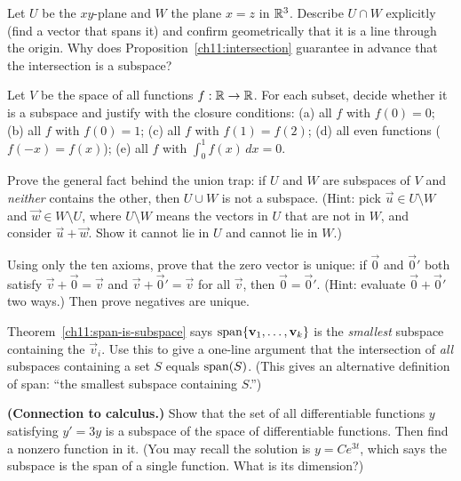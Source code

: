 \begin{exercise}\label{ch11:ex-intersection}
Let $U$ be the $xy$-plane and $W$ the plane $x = z$ in $\mathbb{R}^3$. Describe $U \cap W$
explicitly (find a vector that spans it) and confirm geometrically that it is a line
through the origin. Why does Proposition~\ref{ch11:intersection} guarantee in advance that
the intersection is a subspace?
\end{exercise}

\begin{exercise}\label{ch11:ex-functions}
Let $V$ be the space of all functions $f:\mathbb{R}\to\mathbb{R}$. For each subset, decide whether it is a
subspace and justify with the closure conditions:
(a) all $f$ with $f(0) = 0$; \quad (b) all $f$ with $f(0) = 1$;
(c) all $f$ with $f(1) = f(2)$; \quad (d) all even functions ($f(-x)=f(x)$);
(e) all $f$ with $\int_0^1 f(x)\,dx = 0$.
\end{exercise}

\begin{exercise}\label{ch11:ex-union-proof}
Prove the general fact behind the union trap: if $U$ and $W$ are subspaces of $V$ and
\emph{neither} contains the other, then $U \cup W$ is not a subspace.
(Hint: pick $\vec{u}\in U\setminus W$ and $\vec{w}\in W\setminus U$, where $U\setminus W$
means the vectors in $U$ that are not in $W$, and consider
$\vec{u}+\vec{w}$. Show it cannot lie in $U$ and cannot lie in $W$.)
\end{exercise}

\begin{exercise}\label{ch11:ex-axiom-derive}
Using only the ten axioms, prove that the zero vector is unique: if $\vec{0}$ and
$\vec{0}'$ both satisfy $\vec{v}+\vec{0}=\vec{v}$ and $\vec{v}+\vec{0}'=\vec{v}$ for all
$\vec{v}$, then $\vec{0}=\vec{0}'$. (Hint: evaluate $\vec{0}+\vec{0}'$ two ways.) Then
prove negatives are unique.
\end{exercise}

\begin{exercise}\label{ch11:ex-smallest}
Theorem~\ref{ch11:span-is-subspace} says $\operatorname{span}\{\mathbf{v}_1,\dots,\mathbf{v}_k\}$ is the
\emph{smallest} subspace containing the $\vec{v}_i$. Use this to give a one-line argument
that the intersection of \emph{all} subspaces containing a set $S$ equals $\operatorname{span}(S)$. (This
gives an alternative definition of span: ``the smallest subspace containing $S$.'')
\end{exercise}

\begin{exercise}\label{ch11:ex-de-subspace}
\textbf{(Connection to calculus.)} Show that the set of all differentiable functions $y$
satisfying $y' = 3y$ is a subspace of the space of differentiable functions. Then find a
nonzero function in it. (You may recall the solution is $y = Ce^{3t}$, which says the
subspace is the span of a single function. What is its dimension?)
\end{exercise}

